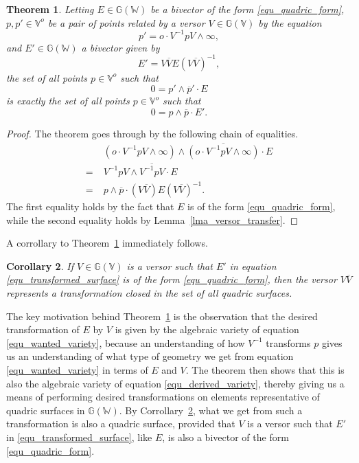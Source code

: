 \documentclass{birkjour}
\newtheorem{thm}{Theorem}[section]
\newtheorem{cor}[thm]{Corollary}
\theoremstyle{definition}
\theoremstyle{remark}
\numberwithin{equation}{section}
\newcommand{\G}{\mathbb{G}}
\newcommand{\V}{\mathbb{V}}
\newcommand{\W}{\mathbb{W}}
\newcommand{\nvao}{o}
\newcommand{\nvai}{\infty}
\begin{document}
\begin{thm}\label{thm_quadric_transform}
Letting $E\in\G(\W)$ be a bivector of the form \eqref{equ_quadric_form},
$p,p'\in\V^o$ be a pair of points related by a versor $V\in\G(\V)$ by
the equation
\begin{equation}\label{equ_get_rid_ni}
p' = \nvao\cdot V^{-1}pV\wedge\nvai,
\end{equation}
and $E'\in\G(\W)$ a bivector given by
\begin{equation}\label{equ_transformed_surface}
E' = V\overline{V}E(V\overline{V})^{-1},
\end{equation}
the set of all points $p\in\V^\nvao$ such that
\begin{equation}\label{equ_wanted_variety}
0 = p'\wedge\overline{p}'\cdot E
\end{equation}
is exactly the set of all points $p\in\V^\nvao$ such that
\begin{equation}\label{equ_derived_variety}
0 = p\wedge\overline{p}\cdot E'.
\end{equation}
\end{thm}
\begin{proof}
The theorem goes through by the following chain of equalities.
\begin{align}
 & (\nvao\cdot V^{-1}pV\wedge\nvai)\wedge\overline{(\nvao\cdot V^{-1}pV\wedge\nvai)}\cdot E \\
=\;& V^{-1}pV\wedge\overline{V^{-1}pV}\cdot E \\
=\;& p\wedge\overline{p}\cdot(V\overline{V})E(V\overline{V})^{-1}.
\end{align}
The first equality holds by the fact that $E$ is of the form \eqref{equ_quadric_form},
while the second equality holds by Lemma~\ref{lma_versor_transfer}.
\end{proof}
A corrollary to Theorem~\ref{thm_quadric_transform} immediately follows.
\begin{cor}\label{cor_quadric_transform}
If $V\in\G(\V)$ is a versor such that $E'$ in equation \eqref{equ_transformed_surface}
is of the form \eqref{equ_quadric_form}, then the versor $V\overline{V}$
represents a transformation closed in the set of all quadric surfaces.
\end{cor}

The key motivation behind Theorem~\ref{thm_quadric_transform} is
the observation that the desired transformation of $E$ by $V$ is
given by the algebraic variety of equation \eqref{equ_wanted_variety}, because
an understanding of how $V^{-1}$ transforms $p$ gives us an understanding
of what type of geometry we get from equation \eqref{equ_wanted_variety} in terms of
$E$ and $V$.  The theorem then
shows that this is also the algebraic variety of equation \eqref{equ_derived_variety}, thereby
giving us a means of performing desired transformations on elements representative
of quadric surfaces in $\G(\W)$.
By Corrollary~\ref{cor_quadric_transform}, what we get
from such a transformation is also a quadric surface, provided that $V$ is a
versor such that $E'$
in \eqref{equ_transformed_surface}, like $E$, is also a bivector of the form \eqref{equ_quadric_form}.
\end{document}
